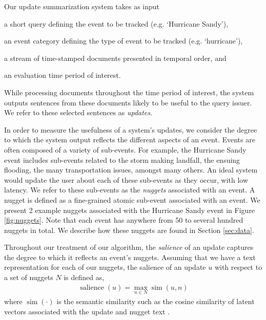 \label{sec:methods}

Our update summarization system takes as input 
\begin{enumerate*}[label=\itshape\alph*\upshape)]
  \item a short query defining the event to be tracked (e.g. `Hurricane Sandy'), 
  \item an event category defining the type of event to be tracked (e.g. `hurricane'), 
  \item a stream of time-stamped documents %
  presented in temporal order, and \item an evaluation time period of interest.
\end{enumerate*} 
While processing documents
throughout the time period of interest, the system outputs sentences
from these documents likely to be useful to the query issuer.  We refer
to these selected sentences as \emph{updates}.

In order to measure the usefulness of a system's updates, we consider
the degree to which the system output reflects the different
aspects of an event.  Events are often composed of a variety of sub-events.  
For example, the Hurricane Sandy
event includes sub-events related to the storm making landfall,
the ensuing flooding, the many transportation issues, amongst many
others.  An ideal system would update the user about each of these
sub-events as they occur, with low latency.  
We refer to these
sub-events as the \emph{nuggets} associated with an event.  A nugget is
defined as a fine-grained atomic sub-event associated with an event.  
We present 2 example nuggets associated with the Hurricane
Sandy event 
in Figure \ref{fig:nuggets}. Note that each event has anywhere from 50 to
several hundred nuggets in total.
We describe how these 
nuggets are found in Section \ref{sec:data}.




Throughout our treatment of our algorithm, the \emph{salience} 
of an update captures the degree to which it reflects an 
event's nuggets.  Assuming that we have a text representation 
for each of our nuggets, the salience of an update $u$  with respect to a set of nuggets $N$ is
defined as,
\begin{align}
\operatorname{salience}(u) = \operatorname{max}_{n \in N} 
\operatorname{sim}(u, n) \label{eq:salience}
\end{align}
where $\operatorname{sim}(\cdot)$ is the semantic similarity such as
the cosine similarity of latent vectors associated with the update and 
nugget text \cite{guo2012simple}. 

